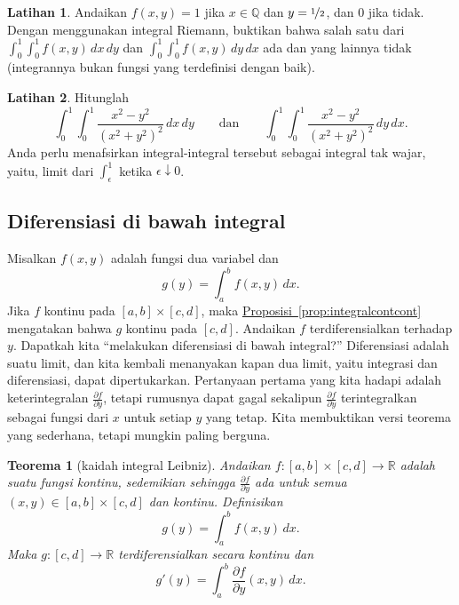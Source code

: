 \documentclass[12pt,openany]{book}
\newcommand{\R}{{\mathbb{R}}}
\newcommand{\Q}{{\mathbb{Q}}}
\newcommand{\myindex}[1]{#1\index{#1}}
\newcommand{\myquote}[1]{``#1''}
\theoremstyle{plain}
\newtheorem{thm}{Teorema}[section]
\theoremstyle{remark}
\theoremstyle{definition}
\newenvironment{exbox}{%
    \def\FrameCommand{\vrule width 1pt \relax\hspace{10pt}}%
    \MakeFramed{\advance\hsize-\width\FrameRestore}%
}{%
    \endMakeFramed
}
\theoremstyle{exercise}
\newtheorem{exercise}{Latihan}[section]
\theoremstyle{example}
\newcommand{\propref}[1]{\hyperref[#1]{Proposisi~\ref*{#1}}}
\begin{document}
\begin{exbox}
\begin{exercise}
Andaikan $f(x,y) = 1$ jika $x \in \Q$ dan $y=\nicefrac{1}{2}$, dan $0$ jika tidak.
Dengan menggunakan integral Riemann, buktikan bahwa salah satu dari
$\int_0^1 \int_0^1 f(x,y) \, dx \, dy$ dan
$\int_0^1 \int_0^1 f(x,y) \, dy \, dx$ ada dan yang lainnya tidak (integrannya
bukan fungsi yang terdefinisi dengan baik).
\end{exercise}

\begin{exercise}
Hitunglah
\begin{equation*}
\int_0^1 \int_0^1 \frac{x^2-y^2}{{(x^2+y^2)}^2} \, dx \, dy
\qquad \text{dan} \qquad
\int_0^1 \int_0^1 \frac{x^2-y^2}{{(x^2+y^2)}^2} \, dy \, dx .
\end{equation*}
Anda perlu menafsirkan integral-integral tersebut sebagai integral tak wajar, yaitu,
limit dari $\int_\epsilon^1$ ketika $\epsilon \downarrow 0$.
\end{exercise}
\end{exbox}

\subsection{Diferensiasi di bawah integral}
\label{subsec:diffunderint}

Misalkan $f(x,y)$ adalah fungsi dua variabel dan
\begin{equation*}
g(y) = \int_a^b f(x,y) \,dx .
\end{equation*}
Jika $f$ kontinu pada $[a,b] \times [c,d]$, maka
\propref{prop:integralcontcont}
mengatakan bahwa $g$ kontinu pada $[c,d]$.
Andaikan $f$ terdiferensialkan terhadap $y$.
Dapatkah kita \myquote{melakukan diferensiasi di bawah integral?}
Diferensiasi adalah suatu limit, dan kita kembali menanyakan kapan
dua limit, yaitu integrasi dan diferensiasi, dapat dipertukarkan.
Pertanyaan pertama
yang kita hadapi adalah keterintegralan
$\frac{\partial f}{\partial y}$, tetapi rumusnya dapat gagal sekalipun
$\frac{\partial f}{\partial y}$ terintegralkan sebagai fungsi dari $x$ untuk setiap
$y$ yang tetap.
Kita membuktikan versi teorema yang sederhana, tetapi mungkin paling berguna.

\begin{thm}[\myindex{kaidah integral Leibniz}]
\label{thm:Leibnizrule}
Andaikan $f \colon [a,b] \times [c,d] \to \R$ adalah suatu fungsi kontinu,
sedemikian sehingga $\frac{\partial f}{\partial y}$ ada untuk semua $(x,y) \in [a,b]
\times [c,d]$ dan kontinu.  Definisikan
\begin{equation*}
g(y) = \int_a^b f(x,y) \,dx .
\end{equation*}
Maka $g \colon [c,d] \to \R$ terdiferensialkan secara kontinu dan
\begin{equation*}
g'(y) = \int_a^b \frac{\partial f}{\partial y}(x,y) \,dx .
\end{equation*}
\end{thm}
\end{document}
